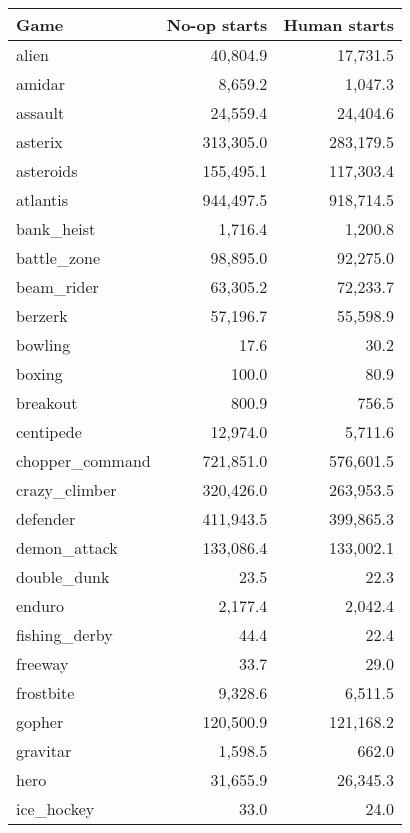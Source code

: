 \documentclass{article} \PassOptionsToPackage{usenames,dvipsnames}{xcolor}
\begin{document}
\begin{table}
\centering
\begin{tabular}{lrr}
\toprule
              Game &     No-op starts &     Human starts \\
\midrule
             alien &   40,804.9 &   17,731.5 \\
            amidar &    8,659.2 &    1,047.3 \\
           assault &   24,559.4 &   24,404.6 \\
           asterix &  313,305.0 &  283,179.5 \\
         asteroids &  155,495.1 &  117,303.4 \\
          atlantis &  944,497.5 &  918,714.5 \\
        bank\_heist &    1,716.4 &    1,200.8 \\
       battle\_zone &   98,895.0 &   92,275.0 \\
        beam\_rider &   63,305.2 &   72,233.7 \\
           berzerk &   57,196.7 &   55,598.9 \\
           bowling &       17.6 &       30.2 \\
            boxing &      100.0 &       80.9 \\
          breakout &      800.9 &      756.5 \\
         centipede &   12,974.0 &    5,711.6 \\
   chopper\_command &  721,851.0 &  576,601.5 \\
     crazy\_climber &  320,426.0 &  263,953.5 \\
          defender &  411,943.5 &  399,865.3 \\
      demon\_attack &  133,086.4 &  133,002.1 \\
       double\_dunk &       23.5 &       22.3 \\
            enduro &    2,177.4 &    2,042.4 \\
     fishing\_derby &       44.4 &       22.4 \\
           freeway &       33.7 &       29.0 \\
         frostbite &    9,328.6 &    6,511.5 \\
            gopher &  120,500.9 &  121,168.2 \\
          gravitar &    1,598.5 &      662.0 \\
              hero &   31,655.9 &   26,345.3 \\
        ice\_hockey &       33.0 &       24.0 \\

\end{tabular}
\end{table}
\end{document}
